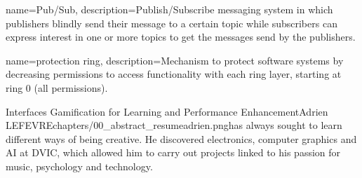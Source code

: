 



{
    name=Pub/Sub,
    description={Publish/Subscribe messaging system in which publishers blindly send their message to a certain topic while subscribers can express interest in one or more topics to get the messages send by the publishers.}
}

{
    name=protection ring,
    description={Mechanism to protect software systems by decreasing permissions to access functionality with each ring layer, starting at ring 0 (all permissions).}
}


\begin{thesis}{Interfaces Gamification for Learning and Performance Enhancement}{Adrien LEFEVRE}{chapters/00_abstract_resume}{adrien.png}{has always sought to learn different ways of being creative. He discovered electronics, computer graphics and AI at DVIC, which allowed him to carry out projects linked to his passion for music, psychology and technology.}
    
    
    
    
    
\end{thesis}
